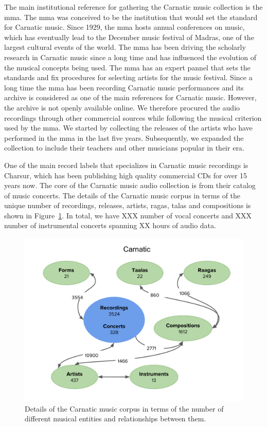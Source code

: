 The main institutional reference for gathering the Carnatic music collection is the \gls{mma}. The \Gls{mma} was conceived to be the institution that would set the standard for Carnatic music. Since 1929, the \Gls{mma} hosts annual conferences on music, which has eventually lead to the December music festival of Madras, one of the largest cultural events of the world. The \gls{mma} has been driving the scholarly research in Carnatic music since a long time and has influenced the evolution of the musical concepts being used. The \gls{mma} has an expert pannel that sets the standards and fix procedures for selecting artists for the music festival. Since a long time the \gls{mma} has been recording Carnatic music performances and its archive is considered as one of the main references for Carnatic music. However, the archive is not openly available online. We therefore procured the audio recordings through other commercial sources while following the musical criterion used by the \gls{mma}. We started by collecting the releases of the artists who have performed in the \gls{mma} in the last five years. Subsequently, we expanded the collection to include their teachers and other musicians popular in their era. 

One of the main record labels that specializes in Carnatic music recordings is Charsur, which has been publishing high quality commercial CDs for over 15 years now. The core of the Carnatic music audio collection is from their catalog of music concerts. The details of the Carnatic music corpus in terms of the unique number of recordings, releases, artists, \glspl{raga}, \glspl{tala} and compositions is shown in Figure~\ref{fig:carnatic_corpus_details}. In total, we have XXX number of vocal concerts and XXX number of instrumental concerts spanning XX hours of audio data.

\begin{figure}
	\begin{center}
		\includegraphics[width=\figSizeHundred]{ch04_datasets/figures/carnatic_corpus.pdf}
	\end{center}
	\caption{Details of the Carnatic music corpus in terms of the number of different musical entities and relationships between them.}
	\label{fig:carnatic_corpus_details}
\end{figure}

